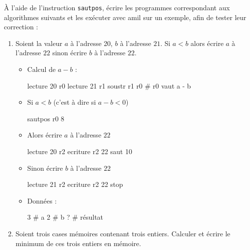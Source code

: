 À l'aide de l'instruction \verb|sautpos|, écrire les programmes
correspondant aux algorithmes suivants et les exécuter avec amil sur
un exemple, afin de tester leur correction :
\begin{enumerate}
\item Soient la valeur $a$ à l'adresse 20, $b$ à l'adresse $21$. Si $a
  < b$ alors écrire $a$ à l'adresse $22$ sinon écrire $b$ à l'adresse
  $22$.
\begin{correction}

\begin{itemize}
\item Calcul de $a - b$ :
\begin{listing}{1}
lecture 20 r0
lecture 21 r1
soustr r1 r0     # r0 vaut a - b
\end{listing}
\item Si $a < b$ (c'est à dire si $a - b < 0$)
\begin{listing}{4}
sautpos r0 8
\end{listing}
\item Alors écrire $a$ à l'adresse $22$
\begin{listing}{5}
lecture 20 r2   
ecriture r2 22
saut 10
\end{listing}
\item Sinon écrire $b$ à l'adresse $22$
\begin{listing}{8}
lecture 21 r2     
ecriture r2 22
stop
\end{listing}
\item Données :
\begin{listing}{20}
3  # a
2  # b
?  # résultat
\end{listing}
\end{itemize}

\end{correction}
\item Soient trois cases mémoires contenant trois entiers. Calculer et écrire le minimum de ces trois entiers en mémoire.
\end{enumerate}

